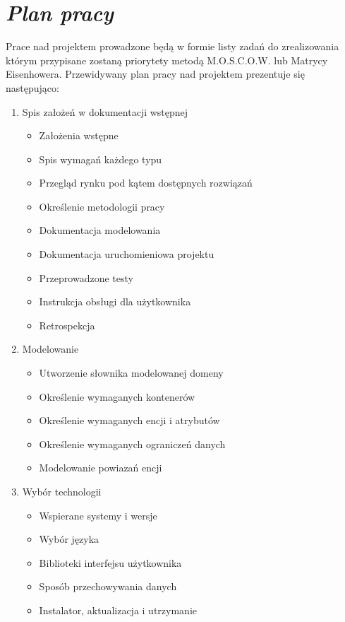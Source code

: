 \documentclass[a4paper,12pt]{report}
\newcommand{\customstylechapter}[1]{\large{\textit{#1}}}
\begin{document}
\chapter{\customstylechapter{Plan pracy}}
{Prace nad projektem prowadzone będą w formie listy zadań do zrealizowania 
którym przypisane zostaną priorytety metodą M.O.S.C.O.W. lub Matrycy 
Eisenhowera. Przewidywany plan pracy nad projektem prezentuje się następująco:
\begin{enumerate}
    \item Spis założeń w dokumentacji wstępnej
    \begin{itemize}
        \item Założenia wstępne
        \item Spis wymagań każdego typu
        \item Przegląd rynku pod kątem dostępnych rozwiązań
        \item Określenie metodologii pracy
        \item Dokumentacja modelowania
        \item Dokumentacja uruchomieniowa projektu
        \item Przeprowadzone testy
        \item Instrukcja obsługi dla użytkownika
        \item Retrospekcja
    \end{itemize}
    \item Modelowanie 
    \begin{itemize}
        \item Utworzenie słownika modelowanej domeny
        \item Określenie wymaganych kontenerów
        \item Określenie wymaganych encji i atrybutów
        \item Określenie wymaganych ograniczeń danych
        \item Modelowanie powiazań encji
    \end{itemize}
    \item Wybór technologii
    \begin{itemize}
        \item Wspierane systemy i wersje
        \item Wybór języka
        \item Biblioteki interfejsu użytkownika
        \item Sposób przechowywania danych
        \item Instalator, aktualizacja i utrzymanie 

\end{itemize}
\end{enumerate}}
\end{document}
